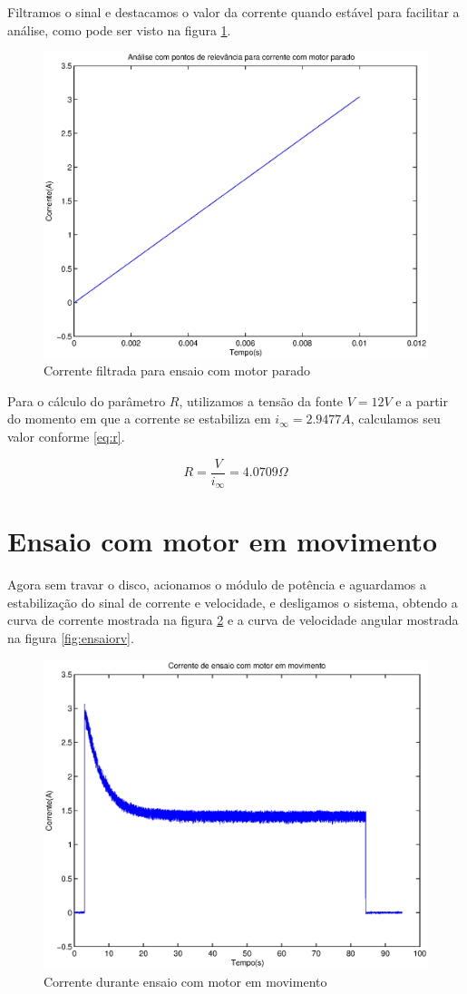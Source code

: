 \documentclass{article}
\begin{document}
Filtramos o sinal e destacamos o valor da corrente quando estável para facilitar a análise, como pode ser visto na figura \ref{fig:riseI}.
\begin{figure}[H]
	\centering
	\includegraphics[width=0.8\linewidth]{../riseI}
	\caption{Corrente filtrada para ensaio com motor parado}
	\label{fig:riseI}
\end{figure}

Para o cálculo do parâmetro $R$, utilizamos a tensão da fonte $V=12 V$ e a partir do momento em que a corrente se estabiliza em $i_\infty=2.9477A$, calculamos seu valor conforme \ref{eq:r}.

\begin{equation}
\label{eq:r}
R = \frac{V}{i_\infty}=4.0709\Omega
\end{equation}

\section{Ensaio com motor em movimento}
Agora sem travar o disco, acionamos o módulo de potência e aguardamos a estabilização do sinal de corrente e velocidade, e desligamos o sistema, obtendo a curva de corrente mostrada na figura \ref{fig:ensaiori} e a curva de velocidade angular mostrada na figura \ref{fig:ensaiorv}.

\begin{figure}[H]
	\centering
	\includegraphics[width=0.8\linewidth]{../ensaiori}
	\caption{Corrente durante ensaio com motor em movimento}
	\label{fig:ensaiori}
\end{figure}
\end{document}
